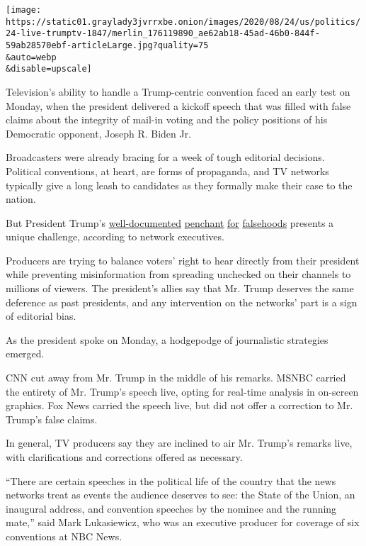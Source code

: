\texttt{[image: https://static01.graylady3jvrrxbe.onion/images/2020/08/24/us/politics/24-live-trumptv-1847/merlin\_176119890\_ae62ab18-45ad-46b0-844f-59ab28570ebf-articleLarge.jpg?quality=75\\\&auto=webp\\\&disable=upscale]}

Television's ability to handle a Trump-centric convention faced an early
test on Monday, when the president delivered a kickoff speech that was
filled with false claims about the integrity of mail-in voting and the
policy positions of his Democratic opponent, Joseph R. Biden Jr.

Broadcasters were already bracing for a week of tough editorial
decisions. Political conventions, at heart, are forms of propaganda, and
TV networks typically give a long leash to candidates as they formally
make their case to the nation.

But President Trump's
\href{https://www.nytimes3xbfgragh.onion/2018/12/29/us/politics/trump-fact-check.html}{well-documented}
\href{https://www.nytimes3xbfgragh.onion/2020/06/03/us/politics/trump-twitter-fact-check.html}{penchant}
\href{https://www.nytimes3xbfgragh.onion/2020/06/24/us/politics/trump-vote-by-mail.html}{for}
\href{https://www.nytimes3xbfgragh.onion/2020/07/14/us/politics/trump-fact-check-biden-police-coronavirus-china.html}{falsehoods}
presents a unique challenge, according to network executives.

Producers are trying to balance voters' right to hear directly from
their president while preventing misinformation from spreading unchecked
on their channels to millions of viewers. The president's allies say
that Mr. Trump deserves the same deference as past presidents, and any
intervention on the networks' part is a sign of editorial bias.

As the president spoke on Monday, a hodgepodge of journalistic
strategies emerged.

CNN cut away from Mr. Trump in the middle of his remarks. MSNBC carried
the entirety of Mr. Trump's speech live, opting for real-time analysis
in on-screen graphics. Fox News carried the speech live, but did not
offer a correction to Mr. Trump's false claims.

In general, TV producers say they are inclined to air Mr. Trump's
remarks live, with clarifications and corrections offered as necessary.

``There are certain speeches in the political life of the country that
the news networks treat as events the audience deserves to see: the
State of the Union, an inaugural address, and convention speeches by the
nominee and the running mate,'' said Mark Lukasiewicz, who was an
executive producer for coverage of six conventions at NBC News.

